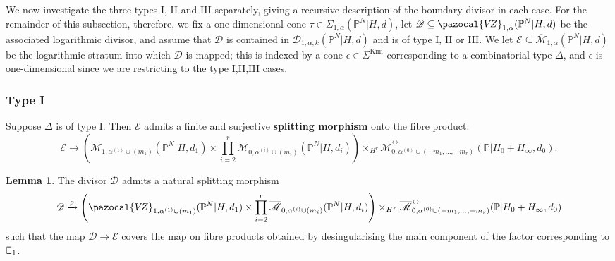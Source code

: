 \documentclass[11pt]{amsart}
\newcommand{\sqC}{\scalebox{0.8}[1.3]{$\sqsubset$}}
\newcommand{\Kim}{\operatorname{Kim}}
\newcommand{\PP}{\mathbb P}
\newcommand{\VZ}{\pazocal{V\!Z}}
\renewcommand{\to}{\rightarrow}
\newcommand{\Mcal}{\mathcal{M}}
\newcommand{\Dcal}{\mathcal{D}}
\newcommand{\Ecal}{\mathcal{E}}
\newcommand{\ol}[1]{\overline{#1}}
\theoremstyle{definition}
\newtheorem{lemma}[thm]{Lemma}
\theoremstyle{definition}
\begin{document}
We now investigate the three types I, II and III separately, giving a recursive description of the boundary divisor in each case. For the remainder of this subsection, therefore, we fix a one-dimensional cone $\tau \in \Sigma_{1,\alpha}(\PP^N|H,d)$, let $\Dcal \subseteq \VZ_{1,\alpha}(\PP^N|H,d)$ be the associated logarithmic divisor, and assume that $\Dcal$ is contained in $\Dcal_{1,\alpha,k}(\PP^N|H,d)$ and is of type I, II or III. We let $\Ecal \subseteq \ol\Mcal_{1,\alpha}(\PP^N|H,d)$ be the logarithmic stratum into which $\Dcal$ is mapped; this is indexed by a cone $\epsilon \in \Sigma^{\Kim}$ corresponding to a combinatorial type $\Delta$, and $\epsilon$ is one-dimensional since we are restricting to the type I,II,III cases.


\subsubsection{Type I}\label{subsubsection type A} Suppose $\Delta$ is of type I. Then $\Ecal$ admits a finite and surjective \textbf{splitting morphism} onto the fibre product:
\begin{equation*} \Ecal \to \left( \ol\Mcal_{1,\alpha^{(1)}\cup(m_1)}(\PP^N|H,d_1) \times \prod_{i=2}^r \ol\Mcal_{0,\alpha^{(i)}\cup(m_i)}(\PP^N|H,d_i) \right) \times_{H^r} \ol\Mcal^{\leftrightarrow}_{0,\alpha^{(0)}\cup (-m_1,\ldots,-m_r)}(\mathbb{P}|H_0+H_\infty,d_0).\end{equation*}

\begin{lemma} \label{Lemma type A gluing} The divisor $\Dcal$ admits a natural splitting morphism
\begin{equation*}\Dcal \xrightarrow{\rho} \left(\VZ_{1,\alpha^{(1)}\cup(m_1)}(\PP^N|H,d_1)\times\prod_{i=2}^r \ol\Mcal_{0,\alpha^{(i)}\cup(m_i)}(\PP^N|H,d_i)\right) \times_{H^r} \ol\Mcal^{\leftrightarrow}_{0,\alpha^{(0)}\cup (-m_1,\ldots,-m_r)}(\mathbb{P}|H_0+H_\infty,d_0)\end{equation*}
such that the map $\Dcal \to \Ecal$ covers the map on fibre products obtained by desingularising the main component of the factor corresponding to $\sqC_1$.\end{lemma}
\end{document}
